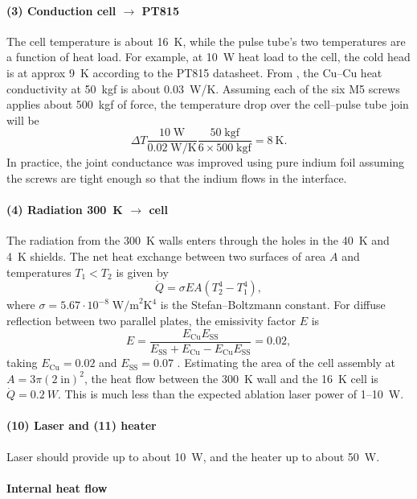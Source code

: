\paragraph{(3) Conduction cell $\rightarrow$ PT815}

The cell temperature
is about 16~K, while the pulse tube's two temperatures are a function of heat
load. For example, at 10~W heat load to the cell, the cold head is at approx 9~K
according to the PT815 datasheet.
From \cite[Fig.~2.7]{ekin2006experimental},
the Cu--Cu heat conductivity at 50~kgf is about 0.03~W/K. 
Assuming each of the six M5 screws applies about 500~kgf of force, the
temperature drop over the cell--pulse tube join will be
%
\[
   \Delta
   T\frac{10\;\text{W}}{0.02\;\text{W/K}}\frac{50\;\text{kgf}}{6\times500\;\text{kgf}}=8~\text{K}.
\]
%
In practice, the joint conductance was improved using pure indium foil assuming
the screws are tight enough so that the indium flows in the interface.

\paragraph{(4) Radiation 300~K $\rightarrow$ cell}

The radiation from the 300~K walls enters through the holes in the 40~K and 4~K
shields. The net heat exchange between two surfaces of area $A$ and temperatures
$T_1<T_2$ is given by \cite[eqn~2.9]{ekin2006experimental}
%
\[
   \dot Q=\sigma E A(T_2^4-T_1^4),
\]
%
where $\sigma=5.67\cdot10^{-8}\;\text{W/m}^2\text{K}^4$ is the
Stefan--Boltzmann constant. For diffuse reflection between two parallel plates,
the emissivity factor $E$ is \cite[Table~2.2]{ekin2006experimental}
%
\[
   E=\frac{E_\text{Cu}E_\text{SS}}{E_\text{SS}+E_\text{Cu}-E_\text{Cu}E_\text{SS}}=0.02,
\]
%
taking $E_\text{Cu}=0.02$ and $E_\text{SS}=0.07$
\cite[Appendix~2.2]{ekin2006experimental}. Estimating the area of the cell
assembly at $A=3\pi(2\;\text{in})^2$, the heat flow between the 300~K wall
and the 16~K cell is $\dot Q=0.2~W$. This is much less than the expected
ablation laser power of 1--10~W.

\paragraph{(10) Laser and (11) heater}

Laser should provide up to about 10~W, and the heater up to about 50~W.

\paragraph{Internal heat flow}

